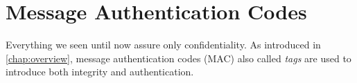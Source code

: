 \section{Message Authentication Codes}
Everything we seen until now assure only confidentiality. As introduced in \autoref{chap:overview}, message authentication codes (MAC) also called \emph{tags} are used to introduce both integrity and authentication.
